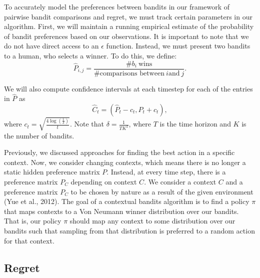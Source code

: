 \documentclass[
  letterpaper,
  numbers=noenddot,
  DIV=11]{scrreprt}
\theoremstyle{definition}
\theoremstyle{plain}
\theoremstyle{plain}
\theoremstyle{remark}
\begin{document}
To accurately model the preferences between bandits in our framework of
pairwise bandit comparisons and regret, we must track certain parameters
in our algorithm. First, we will maintain a running empirical estimate
of the probability of bandit preferences based on our observations. It
is important to note that we do not have direct access to an
\(\epsilon\) function. Instead, we must present two bandits to a human,
who selects a winner. To do this, we define:
\[\hat{P}_{i, j} = \frac{\# b_i\ \text{wins}}{\# \text{comparisons between}\ i \text{and}\ j}.\]

We will also compute confidence intervals at each timestep for each of
the entries in \(\hat{P}\) as
\[\hat{C}_t = \left( \hat{P}_t - c_t, \hat{P}_t + c_t \right),\] where
\(c_t = \sqrt{\frac{4\log(\frac{1}{\delta})}{t}}\). Note that
\(\delta = \frac{1}{TK^2}\), where \(T\) is the time horizon and \(K\)
is the number of bandits.

Previously, we discussed approaches for finding the best action in a
specific context. Now, we consider changing contexts, which means there
is no longer a static hidden preference matrix \(P\). Instead, at every
time step, there is a preference matrix \(P_C\) depending on context
\(C\). We consider a context \(C\) and a preference matrix \(P_C\) to be
chosen by nature as a result of the given environment (Yue et al.,
2012). The goal of a contextual bandits algorithm is to find a policy
\(\pi\) that maps contexts to a Von Neumann winner distribution over our
bandits. That is, our policy \(\pi\) should map any context to some
distribution over our bandits such that sampling from that distribution
is preferred to a random action for that context.

\subsection{Regret}\label{regret}
\end{document}
